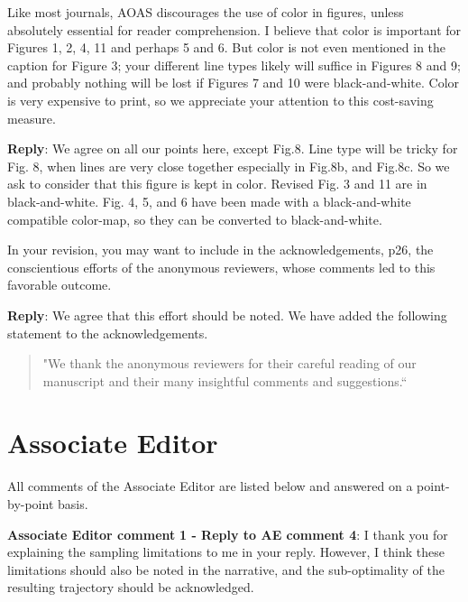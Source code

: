 \documentclass[a4paper]{article}
\newcounter{reviewer}
\def\aecom{\textbf{Associate Editor comment }}
\def\reply{\textbf{Reply}}
\begin{document}
\vspace{5mm}
 Like most journals, AOAS discourages the use of color in figures,
unless absolutely essential for reader comprehension.  I believe
that color is important for Figures 1, 2, 4, 11 and perhaps 5 and 6.
But color is not even mentioned in the caption for Figure 3; your
different line types likely will suffice in Figures 8 and 9; and
probably nothing will be lost if Figures 7 and 10 were black-and-white.
Color is very expensive to print, so we appreciate your attention
to this cost-saving measure.

\vspace{5mm}
\reply: We agree on all our points here, except Fig.8. Line type will be tricky for Fig. 8, when lines are very close together especially in Fig.8b, and Fig.8c. So we ask to consider that this figure is kept in color. Revised Fig. 3 and 11 are in black-and-white. Fig. 4, 5, and 6 have been made with a black-and-white compatible color-map, so they can be converted to black-and-white.

\vspace{5mm}
 In your revision, you may want to include in the
acknowledgements, p26, the conscientious efforts of the anonymous
reviewers, whose comments led to this favorable outcome.

\vspace{5mm}
\reply: We agree that this effort should be noted. We have added the following statement to the acknowledgements.

\begin{quote}
"We thank the anonymous reviewers for their careful reading of our manuscript and their many insightful comments and suggestions.``
\end{quote}

 \section*{Associate Editor}
All comments of the Associate Editor are listed below and answered on a point-by-point basis.

\setcounter{reviewer}{1}

\vspace{5mm}
\noindent \aecom \textbf{1 - Reply to AE comment 4}: 
I thank you for explaining the sampling limitations to me in your reply.  However, I think these limitations should also be noted in the narrative, and the sub-optimality of the resulting trajectory should be acknowledged.
\end{document}
